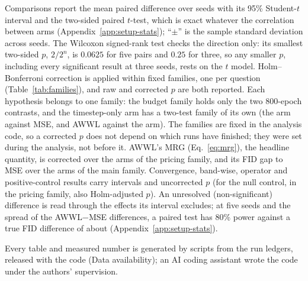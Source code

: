 Comparisons report the mean paired difference over seeds with its 95\%
Student-$t$ interval and the two-sided paired $t$-test, which is exact
whatever the correlation between arms (Appendix~\ref{app:setup-stats});
``$\pm$'' is the sample standard deviation across seeds. The Wilcoxon
signed-rank test \citep{wilcoxon1945individual} checks the direction only:
its smallest two-sided $p$, $2/2^{n}$, is $0.0625$ for five pairs and $0.25$
for three, so any smaller $p$, including every significant result at three
seeds, rests on the $t$ model. Holm--Bonferroni correction
\citep{holm1979simple} is applied within fixed families, one per question
(Table~\ref{tab:families}), and raw and corrected $p$ are both reported. Each
hypothesis belongs to one family: the budget family holds only the two
800-epoch contrasts, and the timestep-only arm has a two-test family of its
own (the arm against MSE, and AWWL against the arm). The families are fixed
in the analysis code, so a corrected $p$ does not depend on which runs have
finished; they were set during the analysis, not before it. AWWL's MRG
(Eq.~\eqref{eq:mrg}), the headline quantity, is corrected over the
\nFamilyPricing{} arms of the pricing family, and its FID gap to MSE over the
\nFamilyMain{} arms of the main family.
Convergence, band-wise, operator and positive-control results carry
intervals and uncorrected $p$ (for the null control, in the pricing
family, also Holm-adjusted $p$). An unresolved (non-significant) difference is read
through the effects its interval excludes; at five seeds and the spread of the
AWWL$-$MSE differences, a paired test has 80\% power against a true FID
difference of about \mdeAWWL{} (Appendix~\ref{app:setup-stats}).

Every table and measured number is generated by scripts from the run ledgers,
released with the code (Data availability); an AI coding assistant wrote the
code under the authors' supervision.
